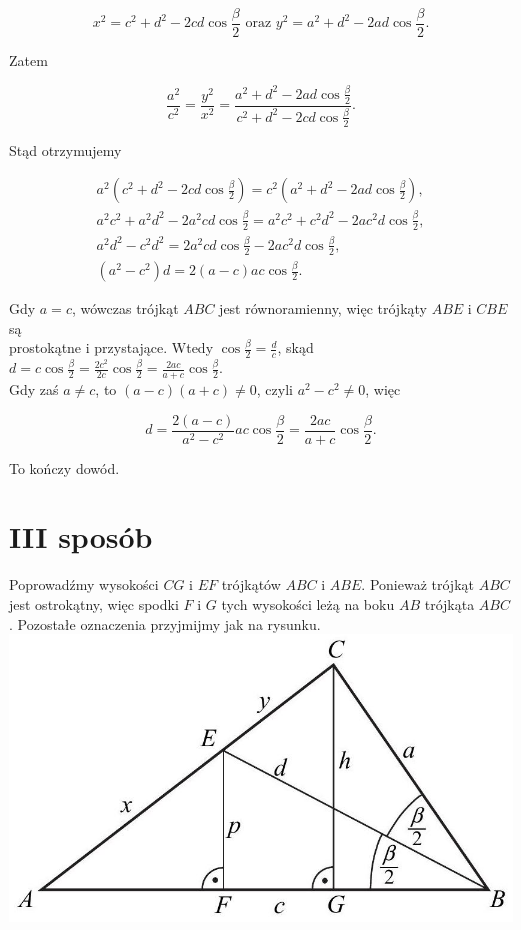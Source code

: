 \documentclass[10pt]{article}
\begin{document}
$$
x^{2}=c^{2}+d^{2}-2 c d \cos \frac{\beta}{2} \text { oraz } y^{2}=a^{2}+d^{2}-2 a d \cos \frac{\beta}{2} .
$$

Zatem

$$
\frac{a^{2}}{c^{2}}=\frac{y^{2}}{x^{2}}=\frac{a^{2}+d^{2}-2 a d \cos \frac{\beta}{2}}{c^{2}+d^{2}-2 c d \cos \frac{\beta}{2}} .
$$

Stąd otrzymujemy

$$
\begin{gathered}
a^{2}\left(c^{2}+d^{2}-2 c d \cos \frac{\beta}{2}\right)=c^{2}\left(a^{2}+d^{2}-2 a d \cos \frac{\beta}{2}\right), \\
a^{2} c^{2}+a^{2} d^{2}-2 a^{2} c d \cos \frac{\beta}{2}=a^{2} c^{2}+c^{2} d^{2}-2 a c^{2} d \cos \frac{\beta}{2}, \\
a^{2} d^{2}-c^{2} d^{2}=2 a^{2} c d \cos \frac{\beta}{2}-2 a c^{2} d \cos \frac{\beta}{2}, \\
\left(a^{2}-c^{2}\right) d=2(a-c) a c \cos \frac{\beta}{2} .
\end{gathered}
$$

Gdy $a=c$, wówczas trójkąt $A B C$ jest równoramienny, więc trójkąty $A B E$ i $C B E$ są\\
prostokątne i przystające. Wtedy $\cos \frac{\beta}{2}=\frac{d}{c}$, skąd $d=c \cos \frac{\beta}{2}=\frac{2 c^{2}}{2 c} \cos \frac{\beta}{2}=\frac{2 a c}{a+c} \cos \frac{\beta}{2}$.\\
Gdy zaś $a \neq c$, to $(a-c)(a+c) \neq 0$, czyli $a^{2}-c^{2} \neq 0$, więc

$$
d=\frac{2(a-c)}{a^{2}-c^{2}} a c \cos \frac{\beta}{2}=\frac{2 a c}{a+c} \cos \frac{\beta}{2} .
$$

To kończy dowód.

\section*{III sposób}
Poprowadźmy wysokości $C G$ i $E F$ trójkątów $A B C$ i $A B E$. Ponieważ trójkąt $A B C$ jest ostrokątny, więc spodki $F$ i $G$ tych wysokości leżą na boku $A B$ trójkąta $A B C$. Pozostałe oznaczenia przyjmijmy jak na rysunku.\\
\includegraphics[max width=\textwidth, center]{2025_02_07_cd06b1485e4d114dda29g-09}
\end{document}
